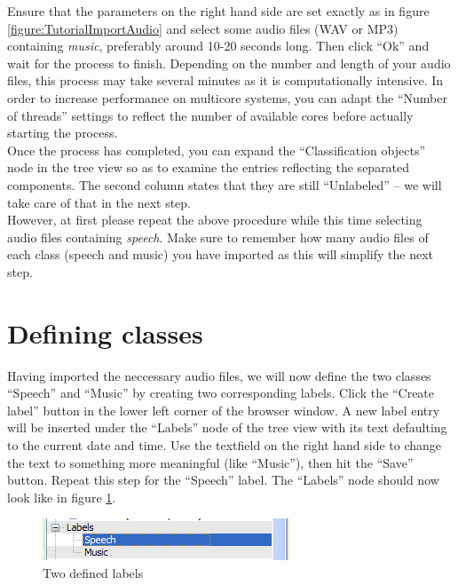 Ensure that the parameters on the right hand side are set exactly as in figure
\ref{figure:TutorialImportAudio} and select some audio files (WAV or MP3)
containing \emph{music}, preferably around 10-20 seconds long. Then click ``Ok''
and wait for the process to finish. Depending on the number and length of your
audio files, this process may take several minutes as it is computationally
intensive. In order to increase performance on multicore systems, you can adapt
the ``Number of threads'' settings to reflect the number of available cores
before actually starting the process.\\

Once the process has completed, you can expand the ``Classification objects''
node in the tree view so as to examine the entries reflecting the separated
components. The second column states that they are still ``Unlabeled'' --
we will take care of that in the next step.\\

However, at first please repeat the above procedure while this time selecting
audio files containing \emph{speech}. Make sure to remember how many audio files
of each class (speech and music) you have imported as this will simplify the
next step.


\section{Defining classes}

Having imported the neccessary audio files, we will now define the two classes
``Speech'' and ``Music'' by creating two corresponding labels. Click the
``Create label'' button in the lower left corner of the browser window. A new
label entry will be inserted under the ``Labels'' node of the tree view with its
text defaulting to the current date and time. Use the textfield on the right
hand side to change the text to something more meaningful (like ``Music''), then
hit the ``Save'' button. Repeat this step for the ``Speech'' label. The
``Labels'' node should now look like in figure \ref{figure:TutorialLabels}.

\begin{figure}
    \centering
    \includegraphics[width=.5\textwidth]{tutorial-media/Labels.png}
    \caption{%
        \label{figure:TutorialLabels}%
        Two defined labels
    }
\end{figure}

